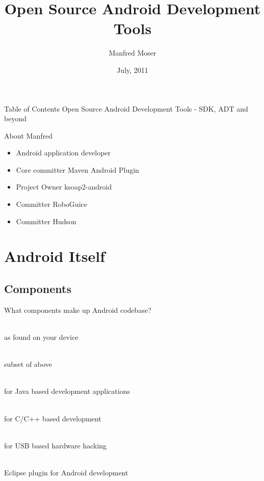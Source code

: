 \documentclass[aspectratio=169]{beamer}
\title{Open Source Android Development Tools}
\author{Manfred Moser}
\date{July, 2011}
\institute{simpligility.com}
\begin{document}
\begin{frame}
  \titlepage
\end{frame}

\begin{frame}{Table of Contents}
  Open Source Android Development Tools - SDK, ADT and beyond
  \setcounter{tocdepth}{1}
  \tableofcontents
\end{frame}

\begin{frame}{About Manfred}
  \begin{itemize}
    \item<1-> Android application developer
    \item<2-> Core committer Maven Android Plugin
    \item<3-> Project Owner ksoap2-android
    \item<4-> Committer RoboGuice
    \item<5-> Committer Hudson
  \end{itemize}

\end{frame}


\section{Android Itself}

  \subsection{Components}
    \begin{frame}{What components make up Android codebase?}
      \begin{description}
        \item<1->[Android Proper] \hfill \\ as found on your device
        \item<2->[Android Open Source Project AOSP] \hfill  \\ subset of above 
        \item<3->[Android Software Development Kit SDK] \hfill  \\ for Java based development applications
        \item<4->[Android Native Development Kit NDK] \hfill  \\ for C/C++ based development
        \item<5->[Android Open Accessory Development Kit ADK] \hfill \\ for USB based hardware hacking
        \item<6->[Android Development Toolkit ADT] \hfill  \\ Eclipse plugin for Android development  
      \end{description}
    \end{frame}
\end{document}
